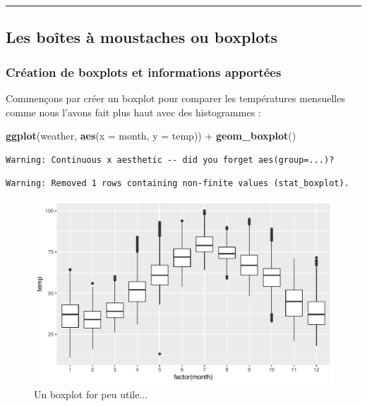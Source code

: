 \documentclass[a4paperpaper,]{article}
\newenvironment{Shaded}{\begin{snugshade}}{\end{snugshade}}
\newcommand{\DataTypeTok}[1]{\textcolor[rgb]{0.00,0.34,0.68}{#1}}
\newcommand{\KeywordTok}[1]{\textcolor[rgb]{0.12,0.11,0.11}{\textbf{#1}}}
\newcommand{\NormalTok}[1]{\textcolor[rgb]{0.12,0.11,0.11}{#1}}
\newcommand{\OperatorTok}[1]{\textcolor[rgb]{0.12,0.11,0.11}{#1}}
\newcommand{\StringTok}[1]{\textcolor[rgb]{0.75,0.01,0.01}{#1}}
\theoremstyle{definition}
\theoremstyle{definition}
\theoremstyle{definition}
\theoremstyle{remark}
\begin{document}
\begin{center}\rule{0.5\linewidth}{\linethickness}\end{center}

\hypertarget{les-boites-a-moustaches-ou-boxplots}{%
\subsection{Les boîtes à moustaches ou
boxplots}\label{les-boites-a-moustaches-ou-boxplots}}

\hypertarget{creation-de-boxplots-et-informations-apportees}{%
\subsubsection{Création de boxplots et informations
apportées}\label{creation-de-boxplots-et-informations-apportees}}

Commençons par créer un boxplot pour comparer les températures
mensuelles comme nous l'avons fait plus haut avec des histogrammes :

\begin{Shaded}
\begin{Highlighting}[]
\KeywordTok{ggplot}\NormalTok{(weather, }\KeywordTok{aes}\NormalTok{(}\DataTypeTok{x =}\NormalTok{ month, }\DataTypeTok{y =}\NormalTok{ temp)) }\OperatorTok{+}
\StringTok{  }\KeywordTok{geom_boxplot}\NormalTok{()}
\end{Highlighting}
\end{Shaded}

\begin{verbatim}
Warning: Continuous x aesthetic -- did you forget aes(group=...)?
\end{verbatim}

\begin{verbatim}
Warning: Removed 1 rows containing non-finite values (stat_boxplot).
\end{verbatim}

\begin{figure}[htpb]

{\centering \includegraphics[width=0.9\linewidth]{figure/unnamed-chunk-55-1} 

}

\caption{Un boxplot for peu utile...}\label{fig:unnamed-chunk-55}
\end{figure}
\end{document}

